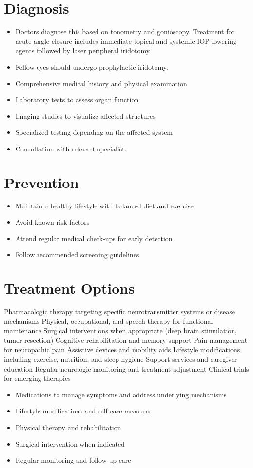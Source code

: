 \section{Diagnosis}
\begin{itemize}[noitemsep]
  \item Doctors diagnose this based on tonometry and gonioscopy. Treatment for acute angle closure includes immediate topical and systemic IOP-lowering agents followed by laser peripheral iridotomy
  \item Fellow eyes should undergo prophylactic iridotomy.
  \item Comprehensive medical history and physical examination
  \item Laboratory tests to assess organ function
  \item Imaging studies to visualize affected structures
  \item Specialized testing depending on the affected system
  \item Consultation with relevant specialists
\end{itemize}
\section{Prevention}
\begin{itemize}[noitemsep]
  \item Maintain a healthy lifestyle with balanced diet and exercise
  \item Avoid known risk factors
  \item Attend regular medical check-ups for early detection
  \item Follow recommended screening guidelines
\end{itemize}
\section{Treatment Options}
Pharmacologic therapy targeting specific neurotransmitter systems or disease mechanisms Physical, occupational, and speech therapy for functional maintenance Surgical interventions when appropriate (deep brain stimulation, tumor resection) Cognitive rehabilitation and memory support Pain management for neuropathic pain Assistive devices and mobility aids Lifestyle modifications including exercise, nutrition, and sleep hygiene Support services and caregiver education Regular neurologic monitoring and treatment adjustment Clinical trials for emerging therapies

\begin{itemize}[noitemsep]
  \item Medications to manage symptoms and address underlying mechanisms
  \item Lifestyle modifications and self-care measures
  \item Physical therapy and rehabilitation
  \item Surgical intervention when indicated
  \item Regular monitoring and follow-up care
\end{itemize}
